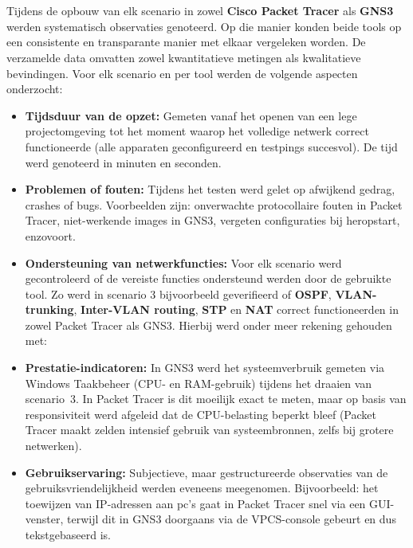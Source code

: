 \section{}
\label{sec:vergelijkingscriteria}

Tijdens de opbouw van elk scenario in zowel \textbf{Cisco Packet Tracer} als \textbf{GNS3} werden systematisch observaties genoteerd. Op die manier konden beide tools op een consistente en transparante manier met elkaar vergeleken worden. De verzamelde data omvatten zowel kwantitatieve metingen als kwalitatieve bevindingen. Voor elk scenario en per tool werden de volgende aspecten onderzocht:

\vspace{0.3cm}

\begin{itemize}
    \item \textbf{Tijdsduur van de opzet:} Gemeten vanaf het openen van een lege projectomgeving tot het moment waarop het volledige netwerk correct functioneerde (alle apparaten geconfigureerd en testpings succesvol). De tijd werd genoteerd in minuten en seconden.
    

    
    \item \textbf{Problemen of fouten:} Tijdens het testen werd gelet op afwijkend gedrag, crashes of bugs. Voorbeelden zijn: onverwachte protocollaire fouten in Packet Tracer, niet-werkende images in GNS3, vergeten configuraties bij heropstart, enzovoort.
    
    \item \textbf{Ondersteuning van netwerkfuncties:} Voor elk scenario werd gecontroleerd of de vereiste functies ondersteund werden door de gebruikte tool. Zo werd in scenario 3 bijvoorbeeld geverifieerd of \textbf{OSPF}, \textbf{VLAN-trunking}, \textbf{Inter-VLAN routing}, \textbf{STP} en \textbf{NAT} correct functioneerden in zowel Packet Tracer als GNS3. Hierbij werd onder meer rekening gehouden met:

    
    \item \textbf{Prestatie-indicatoren:} In GNS3 werd het systeemverbruik gemeten via Windows Taakbeheer (CPU- en RAM-gebruik) tijdens het draaien van scenario~3. In Packet Tracer is dit moeilijk exact te meten, maar op basis van responsiviteit werd afgeleid dat de CPU-belasting beperkt bleef (Packet Tracer maakt zelden intensief gebruik van systeembronnen, zelfs bij grotere netwerken).
    
    \item \textbf{Gebruikservaring:} Subjectieve, maar gestructureerde observaties van de gebruiksvriendelijkheid werden eveneens meegenomen. Bijvoorbeeld: het toewijzen van IP-adressen aan pc’s gaat in Packet Tracer snel via een GUI-venster, terwijl dit in GNS3 doorgaans via de VPCS-console gebeurt en dus tekstgebaseerd is.
\end{itemize}

